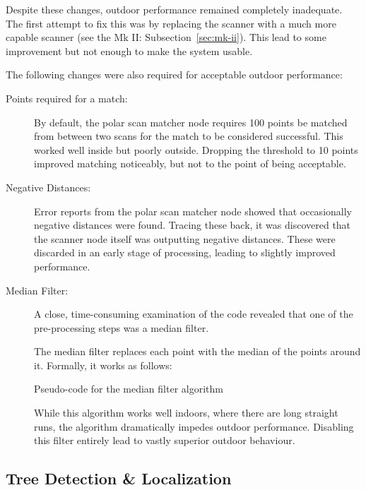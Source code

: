 \documentclass[12pt,oneside,a4paper]{book}
\begin{document}
Despite these changes, outdoor performance remained completely
inadequate. The first attempt to fix this was by replacing the scanner
with a much more capable scanner (see the Mk II:
Subsection~\ref{sec:mk-ii}). This lead to some improvement but not
enough to make the system usable.

The following changes were also required for acceptable outdoor
performance:

\begin{description}
\item[Points required for a match:] By default, the polar scan matcher
  node requires 100 points be matched from between two scans for the
  match to be considered successful. This worked well inside but
  poorly outside. Dropping the threshold to 10
  points improved matching noticeably, but not to the point of being
  acceptable.
\item[Negative Distances:] Error reports from the polar scan matcher node
  showed that occasionally negative distances were found. Tracing
  these back, it was discovered that the scanner node itself was
  outputting negative distances. These were discarded in an early
  stage of processing, leading to slightly improved performance.
\item[Median Filter:] A close, time-consuming examination of the code
  revealed that one of the pre-processing steps was a median filter.

  The median filter replaces each point with the median of the points
  around it. Formally, it works as follows:
  \IncMargin{1em}
  \begin{algorithm}
    \BlankLine
    \caption{Pseudo-code for the median filter algorithm}
  \end{algorithm}

  While this algorithm works well indoors, where there are long
  straight runs, the algorithm dramatically impedes outdoor
  performance. Disabling this filter entirely lead to vastly superior
  outdoor behaviour.
\end{description}


\subsection{Tree Detection \& Localization}
\label{sec:tree-detection-localization}
\end{document}
